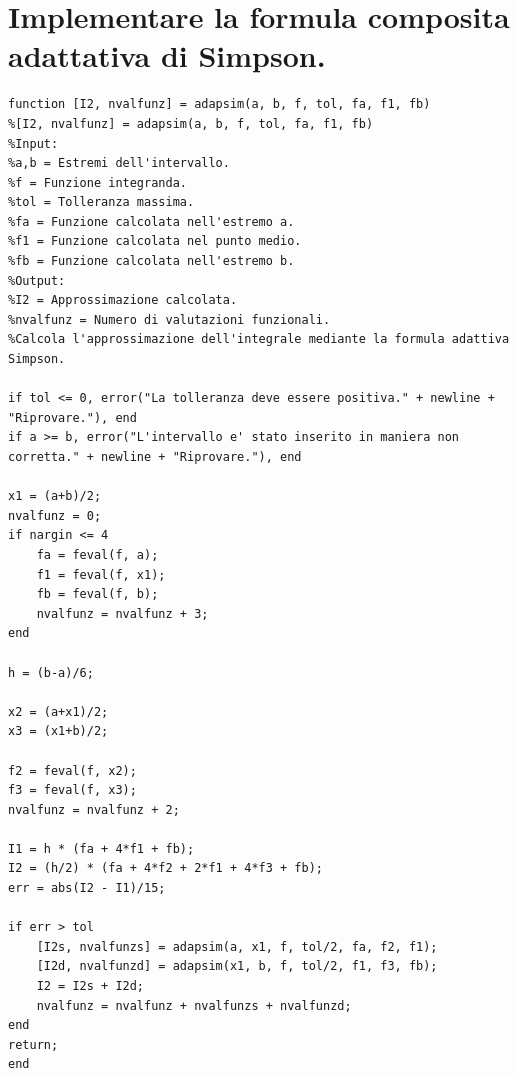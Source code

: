 \documentclass[10pt,a4paper]{article}
\begin{document}
\section{
  Implementare la formula composita adattativa di Simpson.
 }
\begin{lstlisting}[style=Matlab-editor]
function [I2, nvalfunz] = adapsim(a, b, f, tol, fa, f1, fb)
%[I2, nvalfunz] = adapsim(a, b, f, tol, fa, f1, fb)
%Input:
%a,b = Estremi dell'intervallo.
%f = Funzione integranda.
%tol = Tolleranza massima.
%fa = Funzione calcolata nell'estremo a.
%f1 = Funzione calcolata nel punto medio.
%fb = Funzione calcolata nell'estremo b.
%Output:
%I2 = Approssimazione calcolata.
%nvalfunz = Numero di valutazioni funzionali.
%Calcola l'approssimazione dell'integrale mediante la formula adattiva Simpson.
  
if tol <= 0, error("La tolleranza deve essere positiva." + newline + "Riprovare."), end
if a >= b, error("L'intervallo e' stato inserito in maniera non corretta." + newline + "Riprovare."), end
  
x1 = (a+b)/2;
nvalfunz = 0;
if nargin <= 4
    fa = feval(f, a);
    f1 = feval(f, x1);
    fb = feval(f, b);
    nvalfunz = nvalfunz + 3;
end
  
h = (b-a)/6;
  
x2 = (a+x1)/2;
x3 = (x1+b)/2;
  
f2 = feval(f, x2);
f3 = feval(f, x3);
nvalfunz = nvalfunz + 2;
  
I1 = h * (fa + 4*f1 + fb);
I2 = (h/2) * (fa + 4*f2 + 2*f1 + 4*f3 + fb);
err = abs(I2 - I1)/15;
  
if err > tol
    [I2s, nvalfunzs] = adapsim(a, x1, f, tol/2, fa, f2, f1);
    [I2d, nvalfunzd] = adapsim(x1, b, f, tol/2, f1, f3, fb);
    I2 = I2s + I2d;
    nvalfunz = nvalfunz + nvalfunzs + nvalfunzd;
end
return;
end
\end{lstlisting}
\end{document}

